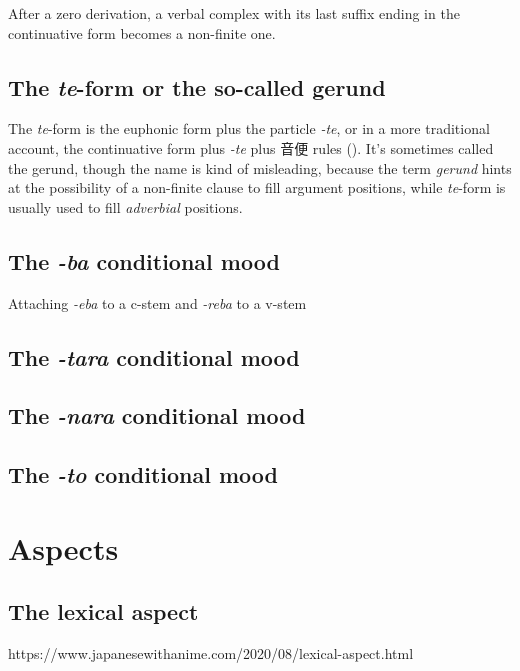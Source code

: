 \documentclass[UTF8, a4paper, oneside, scheme=plain]{ctexrep}
\newcommand*{\term}[1]{\emph{#1}}
\newcommand{\corpus}[1]{\emph{#1}}
\begin{document}
After a zero derivation, 
a verbal complex with its last suffix ending in the continuative form 
becomes a non-finite one.

\subsection{The \corpus{te}-form or the so-called gerund}\label{sec:te-form}

The \corpus{te}-form is the euphonic form plus the particle \corpus{-te},
or in a more traditional account,
the continuative form plus \corpus{-te} plus 音便 rules ().
It's sometimes called the gerund,
though the name is kind of misleading,
because the term \term{gerund} hints at the possibility of a non-finite clause to fill argument positions,
while \corpus{te}-form is usually used to fill \emph{adverbial} positions.

\subsection{The \corpus{-ba} conditional mood} \label{sec:eba-form}

Attaching \corpus{-eba} to a c-stem and \corpus{-reba} to a v-stem 

\subsection{The \corpus{-tara} conditional mood}\label{sec:tara-form}

\subsection{The \corpus{-nara} conditional mood}

\subsection{The \corpus{-to} conditional mood}

\section{Aspects}\label{sec:aspect}

\subsection{The lexical aspect}\label{sec:lexical-aspect}

https://www.japanesewithanime.com/2020/08/lexical-aspect.html
\end{document}
